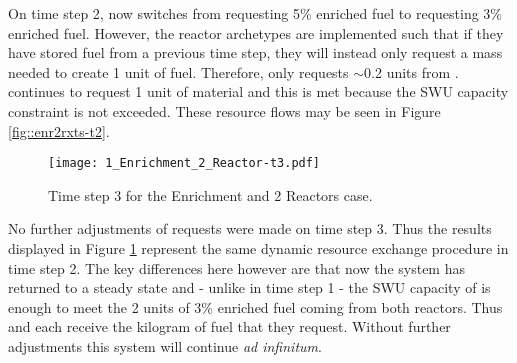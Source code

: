 On time step 2,  now switches from requesting 5\% enriched fuel to
requesting 3\% enriched fuel.  However, the reactor archetypes are implemented
such that if they have stored fuel from a previous time step, they will instead
only request a mass needed to create 1 unit of fuel.  Therefore,  only
requests $\sim$0.2 units from \Enrichment{}.   continues to request 1 unit
of material and this is met because the SWU capacity constraint is not exceeded.
These resource flows may be seen in Figure \ref{fig::enr2rxts-t2}.

\begin{figure}
  \begin{center}
    \texttt{[image: 1\_Enrichment\_2\_Reactor-t3.pdf]}
    \caption[]{\label{fig::enr2rxts-t3}Time step 3 for the Enrichment and 2 Reactors 
        case.}
  \end{center}
\end{figure}

No further adjustments of requests were made on time step 3. Thus the results
displayed in Figure \ref{fig::enr2rxts-t3} represent the same dynamic resource
exchange procedure in time step 2.  The key differences here however are that
now the system has returned to a steady state and - unlike in time step 1 - the
SWU capacity of \Enrichment{} is enough to meet the 2 units of 3\% enriched fuel
coming from both reactors.  Thus  and  each receive the
kilogram of fuel that they request.  Without further adjustments this system
will continue \emph{ad infinitum}.
